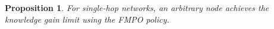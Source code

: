 \documentclass[12pt,epsf]{article}
\newtheorem{prop}{Proposition}
\theoremstyle{definition}
\begin{document}
%
\vspace{-0.2 cm}
\begin{prop}
For single-hop networks, an arbitrary node achieves the knowledge gain limit using the {\it FMPO} policy.
\end{prop}
%
\vspace{-0.5 cm}
\end{document}
